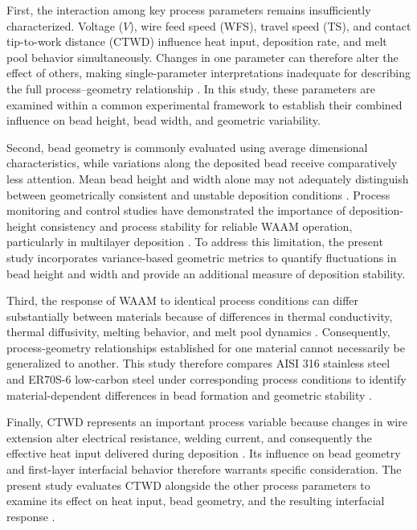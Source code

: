 \documentclass[conference]{IEEEtran}
\begin{document}
First, the interaction among key process parameters remains insufficiently characterized. Voltage ($V$), wire feed speed (WFS), travel speed (TS), and contact tip-to-work distance (CTWD) influence heat input, deposition rate, and melt pool behavior simultaneously. Changes in one parameter can therefore alter the effect of others, making single-parameter interpretations inadequate for describing the full process--geometry relationship \cite{mansor2024waam_opt,debroy2018,jain2026}. In this study, these parameters are examined within a common experimental framework to establish their combined influence on bead height, bead width, and geometric variability.

Second, bead geometry is commonly evaluated using average dimensional characteristics, while variations along the deposited bead receive comparatively less attention. Mean bead height and width alone may not adequately distinguish between geometrically consistent and unstable deposition conditions 
\cite{Lambiase2022,Karmuhilan2018,song2012control}. Process monitoring and control studies have demonstrated the importance of deposition-height consistency and process stability for reliable WAAM operation, particularly in multilayer deposition
\cite{Colegrove2013HighPressureRolling,Craeghs2011Monitoring}. To address this limitation, the present study incorporates variance-based geometric metrics to quantify fluctuations in bead height and width and provide an additional measure of deposition stability.

Third, the response of WAAM to identical process conditions can differ substantially between materials because of differences in thermal conductivity, thermal diffusivity, melting behavior, and melt pool dynamics \cite{debroy2018,Guo2021MLAM,Sharma2022PhysicsML}. Consequently, process-geometry relationships established for one material cannot necessarily be generalized to another. This study therefore compares AISI 316 stainless steel and ER70S-6 low-carbon steel under corresponding process conditions to identify material-dependent differences in bead formation and geometric stability
\cite{jain2026,Le2022,Lewandowski2016Review}.

Finally, CTWD represents an important process variable because changes in wire extension alter electrical resistance, welding current, and consequently the effective heat input delivered during deposition \cite{jain2026,ebika2020waam}. Its influence on bead geometry and first-layer interfacial behavior therefore warrants specific consideration. The present study evaluates CTWD alongside the other process parameters to examine its effect on heat input, bead geometry, and the resulting interfacial response \cite{ding2015,jain2026}.
\end{document}
